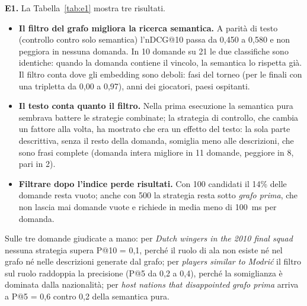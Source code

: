 \documentclass[11pt,a4paper]{article}
\begin{document}
\textbf{E1.} La Tabella~\ref{tab:e1} mostra tre risultati.
\begin{itemize}
  \item \textbf{Il filtro del grafo migliora la ricerca semantica.} A parità di testo (controllo contro solo semantica) l'nDCG@10 passa da 0,450 a 0,580 e non peggiora in nessuna domanda. In 10 domande su 21 le due classifiche sono identiche: quando la domanda contiene il vincolo, la semantica lo rispetta già. Il filtro conta dove gli embedding sono deboli: fasi del torneo (per le finali con una tripletta da 0,00 a 0,97), anni dei giocatori, paesi ospitanti.
  \item \textbf{Il testo conta quanto il filtro.} Nella prima esecuzione la semantica pura sembrava battere le strategie combinate; la strategia di controllo, che cambia un fattore alla volta, ha mostrato che era un effetto del testo: la sola parte descrittiva, senza il resto della domanda, somiglia meno alle descrizioni, che sono frasi complete (domanda intera migliore in 11 domande, peggiore in 8, pari in 2).
  \item \textbf{Filtrare dopo l'indice perde risultati.} Con 100 candidati il 14\% delle domande resta vuoto; anche con 500 la strategia resta sotto \emph{grafo prima}, che non lascia mai domande vuote e richiede in media meno di 100~ms per domanda.
\end{itemize}
Sulle tre domande giudicate a mano: per \emph{Dutch wingers in the 2010 final squad} nessuna strategia supera P@10 = 0,1, perché il ruolo di ala non esiste né nel grafo né nelle descrizioni generate dal grafo; per \emph{players similar to Modrić} il filtro sul ruolo raddoppia la precisione (P@5 da 0,2 a 0,4), perché la somiglianza è dominata dalla nazionalità; per \emph{host nations that disappointed} \emph{grafo prima} arriva a P@5 = 0,6 contro 0,2 della semantica pura.
\end{document}
